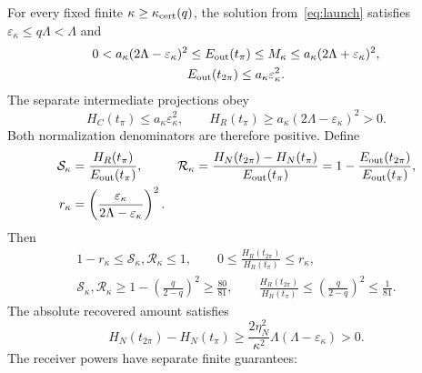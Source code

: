 \begin{theorem}\label{thm:transfer}%
For every fixed finite $\kappa\ge\kappa_{\rm cert}(q)$, the solution from~\eqref{eq:launch} satisfies $\varepsilon_\kappa\le q\Lambda<\Lambda$ and
\begin{equation}\label{eq:stockbounds}%
\begin{gathered}
0<a_\kappa(2\Lambda-\varepsilon_\kappa)^2
\le E_{\rm out}(t_\pi)\le M_\kappa
\le a_\kappa(2\Lambda+\varepsilon_\kappa)^2,\\
E_{\rm out}(t_{2\pi})\le a_\kappa\varepsilon_\kappa^2 .
\end{gathered}
\end{equation}
The separate intermediate projections obey
\begin{equation}\label{eq:projectedbounds}%
H_C(t_\pi)\le a_\kappa\varepsilon_\kappa^2,\qquad
H_R(t_\pi)\ge a_\kappa(2\Lambda-\varepsilon_\kappa)^2>0.
\end{equation}
Both normalization denominators are therefore positive. Define
\begin{equation}\label{eq:fractions}%
\begin{aligned}
\mathcal S_\kappa&=\frac{H_R(t_\pi)}{E_{\rm out}(t_\pi)},&
\mathcal R_\kappa&=\frac{H_N(t_{2\pi})-H_N(t_\pi)}{E_{\rm out}(t_\pi)}
=1-\frac{E_{\rm out}(t_{2\pi})}{E_{\rm out}(t_\pi)},\\
r_\kappa&=\left(\frac{\varepsilon_\kappa}{2\Lambda-\varepsilon_\kappa}\right)^2 .
\end{aligned}
\end{equation}
Then
\begin{equation}\label{eq:ratiobounds}%
\begin{gathered}
1-r_\kappa\le\mathcal S_\kappa,\mathcal R_\kappa\le1,\qquad
0\le\frac{H_R(t_{2\pi})}{H_R(t_\pi)}\le r_\kappa,\\
\mathcal S_\kappa,\mathcal R_\kappa
\ge1-\left(\frac q{2-q}\right)^2\ge\frac{80}{81},\qquad
\frac{H_R(t_{2\pi})}{H_R(t_\pi)}
\le\left(\frac q{2-q}\right)^2\le\frac1{81}.
\end{gathered}
\end{equation}
The absolute recovered amount satisfies
\begin{equation}\label{eq:recoveredamount}%
H_N(t_{2\pi})-H_N(t_\pi)
\ge\frac{2\eta_N^2}{\kappa^2}\Lambda(\Lambda-\varepsilon_\kappa)>0.
\end{equation}
The receiver powers have separate finite guarantees:

\end{theorem}
